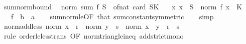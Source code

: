 \begin{isabellebody}
\endisatagproof
{\isafoldproof}%
%
\isadelimproof
\isanewline
%
\endisadelimproof
\isanewline
{}\isamarkupfalse%
\ sum{\isacharunderscore}{\kern0pt}norm{\isacharunderscore}{\kern0pt}bound{\isacharcolon}{\kern0pt}\isanewline
\ \ {\isachardoublequoteopen}norm\ {\isacharparenleft}{\kern0pt}sum\ f\ S{\isacharparenright}{\kern0pt}\ {\isasymle}\ of{\isacharunderscore}{\kern0pt}nat\ {\isacharparenleft}{\kern0pt}card\ S{\isacharparenright}{\kern0pt}{\isacharasterisk}{\kern0pt}K{\isachardoublequoteclose}\isanewline
\ \ \ {\isachardoublequoteopen}{\isasymAnd}x{\isachardot}{\kern0pt}\ x\ {\isasymin}\ S\ {\isasymLongrightarrow}\ norm\ {\isacharparenleft}{\kern0pt}f\ x{\isacharparenright}{\kern0pt}\ {\isasymle}\ K{\isachardoublequoteclose}\isanewline
\ \ \ f\ {\isacharcolon}{\kern0pt}{\isacharcolon}{\kern0pt}\ {\isachardoublequoteopen}{\isacharprime}{\kern0pt}b\ {\isasymRightarrow}\ {\isacharprime}{\kern0pt}a{\isachardoublequoteclose}\isanewline
%
\isadelimproof
\ \ %
\endisadelimproof
%
\isatagproof
{}\isamarkupfalse%
\ sum{\isacharunderscore}{\kern0pt}norm{\isacharunderscore}{\kern0pt}le{\isacharbrackleft}{\kern0pt}OF\ that{\isacharbrackright}{\kern0pt}\ sum{\isacharunderscore}{\kern0pt}constant{\isacharbrackleft}{\kern0pt}symmetric{\isacharbrackright}{\kern0pt}\isanewline
\ \ \isamarkupfalse%
\ simp%
\endisatagproof
{\isafoldproof}%
%
\isadelimproof
\isanewline
%
\endisadelimproof
\isanewline
{}\isamarkupfalse%
\ norm{\isacharunderscore}{\kern0pt}add{\isacharunderscore}{\kern0pt}less{\isacharcolon}{\kern0pt}\ {\isachardoublequoteopen}norm\ x\ {\isacharless}{\kern0pt}\ r\ {\isasymLongrightarrow}\ norm\ y\ {\isacharless}{\kern0pt}\ s\ {\isasymLongrightarrow}\ norm\ {\isacharparenleft}{\kern0pt}x\ {\isacharplus}{\kern0pt}\ y{\isacharparenright}{\kern0pt}\ {\isacharless}{\kern0pt}\ r\ {\isacharplus}{\kern0pt}\ s{\isachardoublequoteclose}\isanewline
%
\isadelimproof
\ \ %
\endisadelimproof
%
\isatagproof
{}\isamarkupfalse%
\ {\isacharparenleft}{\kern0pt}rule\ order{\isacharunderscore}{\kern0pt}le{\isacharunderscore}{\kern0pt}less{\isacharunderscore}{\kern0pt}trans\ {\isacharbrackleft}{\kern0pt}OF\ norm{\isacharunderscore}{\kern0pt}triangle{\isacharunderscore}{\kern0pt}ineq\ add{\isacharunderscore}{\kern0pt}strict{\isacharunderscore}{\kern0pt}mono{\isacharbrackright}{\kern0pt}{\isacharparenright}{\kern0pt}%
\endisatagproof
{\isafoldproof}%
%
\isadelimproof
\isanewline
%
\endisadelimproof
\isanewline
{}\isamarkupfalse%
\isanewline
\isanewline
{}\isamarkupfalse%

\end{isabellebody}
